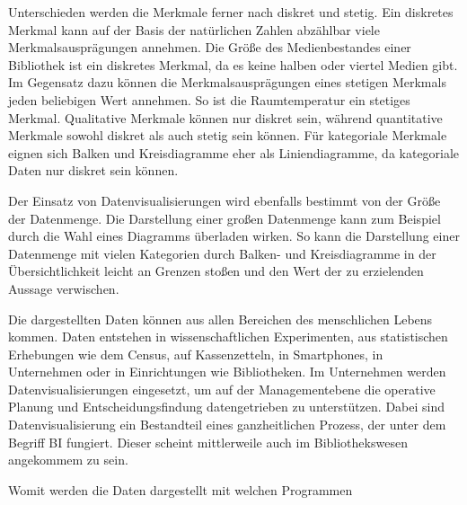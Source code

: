 Unterschieden werden die Merkmale ferner nach diskret und stetig.
Ein diskretes Merkmal kann auf der Basis der natürlichen Zahlen abzählbar viele Merkmalsausprägungen annehmen.
Die Größe des Medienbestandes einer Bibliothek ist ein diskretes Merkmal, da es keine halben oder viertel Medien gibt.
Im Gegensatz dazu können die Merkmalsausprägungen eines stetigen Merkmals jeden beliebigen Wert annehmen. So ist die Raumtemperatur ein stetiges Merkmal.
Qualitative Merkmale können nur diskret sein, während quantitative Merkmale sowohl diskret als auch stetig sein können. 
Für kategoriale Merkmale eignen sich Balken und Kreisdiagramme eher als Liniendiagramme, da kategoriale Daten nur diskret sein können.

Der Einsatz von Datenvisualisierungen wird ebenfalls bestimmt von der Größe der Datenmenge.
Die Darstellung einer großen Datenmenge kann zum Beispiel durch die Wahl eines Diagramms überladen wirken. 
So kann die Darstellung einer Datenmenge mit vielen Kategorien durch Balken- und Kreisdiagramme 
in der Übersichtlichkeit leicht an Grenzen stoßen und den Wert der zu erzielenden Aussage verwischen.

Die dargestellten Daten können aus allen Bereichen des menschlichen Lebens kommen. Daten entstehen in wissenschaftlichen Experimenten, aus statistischen Erhebungen wie 
dem Census, auf Kassenzetteln, in Smartphones, in Unternehmen oder in Einrichtungen wie Bibliotheken. 
Im Unternehmen werden Datenvisualisierungen eingesetzt, um auf der Managementebene die operative Planung und Entscheidungsfindung  datengetrieben zu unterstützen.
Dabei sind Datenvisualisierung ein Bestandteil eines ganzheitlichen Prozess, der unter dem Begriff \acrfull{BI} fungiert. Dieser scheint mittlerweile auch im Bibliothekswesen angekommem zu sein.

Womit werden die Daten dargestellt mit welchen Programmen





